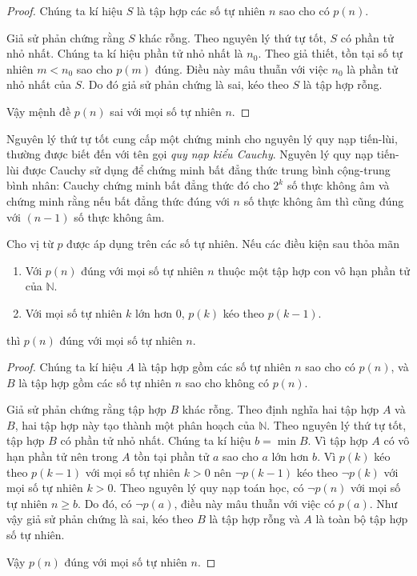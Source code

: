 \begin{proof}
    Chúng ta kí hiệu $S$ là tập hợp các số tự nhiên $n$ sao cho có $p(n)$.

    Giả sử phản chứng rằng $S$ khác rỗng. Theo nguyên lý thứ tự tốt, $S$ có phần tử nhỏ nhất. Chúng ta kí hiệu phần tử nhỏ nhất là $n_{0}$. Theo giả thiết, tồn tại số tự nhiên $m < n_{0}$ sao cho $p(m)$ đúng. Điều này mâu thuẫn với việc $n_{0}$ là phần tử nhỏ nhất của $S$. Do đó giả sử phản chứng là sai, kéo theo $S$ là tập hợp rỗng.

    Vậy mệnh đề $p(n)$ sai với mọi số tự nhiên $n$.
\end{proof}

Nguyên lý thứ tự tốt cung cấp một chứng minh cho nguyên lý quy nạp tiến-lùi, thường được biết đến với tên gọi \textit{quy nạp kiểu Cauchy}. Nguyên lý quy nạp tiến-lùi được Cauchy sử dụng để chứng minh bất đẳng thức trung bình cộng-trung bình nhân: Cauchy chứng minh bất đẳng thức đó cho $2^{k}$ số thực không âm và chứng minh rằng nếu bất đẳng thức đúng với $n$ số thực không âm thì cũng đúng với $(n-1)$ số thực không âm.
\begin{theorem}
    Cho vị từ $p$ được áp dụng trên các số tự nhiên. Nếu các điều kiện sau thỏa mãn
    \begin{enumerate}[label={(\roman*)}]
        \item Với $p(n)$ đúng với mọi số tự nhiên $n$ thuộc một tập hợp con vô hạn phần tử của $\mathbb{N}$.
        \item Với mọi số tự nhiên $k$ lớn hơn $0$, $p(k)$ kéo theo $p(k-1)$.
    \end{enumerate}

    \noindent thì $p(n)$ đúng với mọi số tự nhiên $n$.
\end{theorem}

\begin{proof}
    Chúng ta kí hiệu $A$ là tập hợp gồm các số tự nhiên $n$ sao cho có $p(n)$, và $B$ là tập hợp gồm các số tự nhiên $n$ sao cho không có $p(n)$.

    Giả sử phản chứng rằng tập hợp $B$ khác rỗng. Theo định nghĩa hai tập hợp $A$ và $B$, hai tập hợp này tạo thành một phân hoạch của $\mathbb{N}$. Theo nguyên lý thứ tự tốt, tập hợp $B$ có phần tử nhỏ nhất. Chúng ta kí hiệu $b = \min B$. Vì tập hợp $A$ có vô hạn phần tử nên trong $A$ tồn tại phần tử $a$ sao cho $a$ lớn hơn $b$. Vì $p(k)$ kéo theo $p(k-1)$ với mọi số tự nhiên $k > 0$ nên $\neg p(k-1)$ kéo theo $\neg p(k)$ với mọi số tự nhiên $k > 0$. Theo nguyên lý quy nạp toán học, có $\neg p(n)$ với mọi số tự nhiên $n\geq b$. Do đó, có $\neg p(a)$, điều này mâu thuẫn với việc có $p(a)$. Như vậy giả sử phản chứng là sai, kéo theo $B$ là tập hợp rỗng và $A$ là toàn bộ tập hợp số tự nhiên.

    Vậy $p(n)$ đúng với mọi số tự nhiên $n$.
\end{proof}

